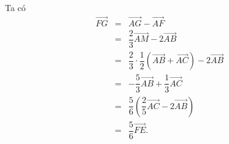 \begin{ex}
{\begin{itemchoice}
Ta có
\allowdisplaybreaks
\begin{eqnarray*}
\overrightarrow{FG}&=&\overrightarrow{AG}-\overrightarrow{AF}\\
&=&\dfrac{2}{3}\overrightarrow{AM}-2\overrightarrow{AB}\\
&=&\dfrac{2}{3}\cdot\dfrac{1}{2}\left(\overrightarrow{AB}+\overrightarrow{AC}\right)-2\overrightarrow{AB}\\
&=&-\dfrac{5}{3}\overrightarrow{AB}+\dfrac{1}{3}\overrightarrow{AC}\\
&=&\dfrac{5}{6}\left(\dfrac{2}{5}\overrightarrow{AC}-2\overrightarrow{AB}\right)\\
&=&\dfrac{5}{6}\overrightarrow{FE}.
\end{eqnarray*}
\end{itemchoice}
}
\end{ex}


